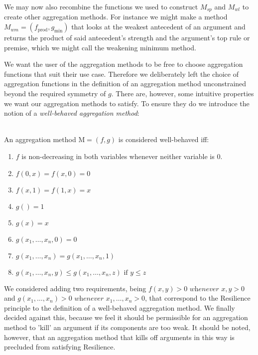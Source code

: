 \documentclass[runningheads]{llncs}
\begin{document}
We may now also recombine the functions we used to construct $M_{sp}$ and $M_{wl}$ to create other aggregation methods. For instance we might make a method $M_{wm} = (f_{\text{prod}},g_{\text{min}})$ that looks at the weakest antecedent of an argument and returns the product of said antecedent's strength and the argument's top rule or premise, which we might call the weakening minimum method.

We want the user of the aggregation methods to be free to choose aggregation functions that suit their use case. Therefore we deliberately left the choice of aggregation functions in the definition of an aggregation method unconstrained beyond the required symmetry of $g$. There are, however, some intuitive properties we want our aggregation methods to satisfy. To ensure they do we introduce the notion of a \textit{well-behaved aggregation method}:

\begin{definition}\label{Well-Behaved}\\
An aggregation method $\text{M} = ( f,g )$ is considered well-behaved iff:
\begin{enumerate}
    \item $f$ is non-decreasing in both variables whenever neither variable is $0$.
    \item $f(0,x) = f(x,0) = 0$
    \item $f(x,1)=f(1,x)=x$
    \item $g()=1$
    \item $g(x)=x$
    \item $g(x_1,\dots, x_n ,0) = 0$
    \item $g(x_1, \dots, x_n) = g(x_1, \dots, x_n, 1)$
    \item $g(x_1, \dots, x_n, y) \leq g(x_1, \dots, x_n, z) \text{ if } y \leq z$
\end{enumerate}\end{definition}

We considered adding two requirements, being $f(x,y) > 0 \textit{ whenever } x,y>0$ and $g(x_1,\dots,x_n) > 0 \textit{ whenever } x_1,\dots,x_n>0$, that correspond to the Resilience principle to the definition of a well-behaved aggregation method. We finally decided against this, because we feel it should be permissible for an aggregation method to 'kill' an argument if its components are too weak. It should be noted, however, that an aggregation method that kills off arguments in this way is precluded from satisfying Resilience.
\end{document}
